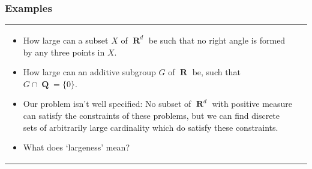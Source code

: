 \documentclass[usenames,dvipsnames]{beamer}
\DeclareMathOperator{\RR}{\textbf{R}}
\DeclareMathOperator{\QQ}{\textbf{Q}}
\begin{document}
\begin{frame}
  \frametitle{Examples}

\begin{tabular}{p{}p{}}

\begin{itemize}
    \pause
    \item How large can a subset $X$ of $\RR^d$ be such that no right angle is formed by any three points in $X$.


    \pause
    \item How large can an additive subgroup $G$ of $\RR$ be, such that $G \cap \QQ = \{ 0 \}$.


    \pause
    \item Our problem isn't well specified: No subset of $\RR^d$ with positive measure can satisfy the constraints of these problems, but we can find discrete sets of arbitrarily large cardinality which do satisfy these constraints.

    \pause
    \item What does `largeness' mean?
\end{itemize}

\end{tabular}
\end{frame}
\end{document}
